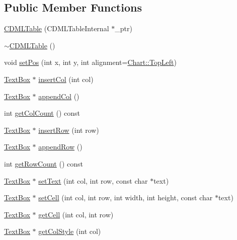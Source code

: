 \subsection*{Public Member Functions}
\begin{DoxyCompactItemize}
\item 
\hyperlink{class_c_d_m_l_table_a88e819b536ce3deca496ff54224bc939}{C\+D\+M\+L\+Table} (C\+D\+M\+L\+Table\+Internal $\ast$\+\_\+ptr)
\item 
\hyperlink{class_c_d_m_l_table_a1d115374895e7594e70e25b45816c29d}{$\sim$\+C\+D\+M\+L\+Table} ()
\item 
void \hyperlink{class_c_d_m_l_table_ae3601809a2a92183ceb02a33644cfd89}{set\+Pos} (int x, int y, int alignment=\hyperlink{namespace_chart_ae222e51ce11a254450b6ddfbc862680aa0bf92d1d2d6713aa62e92b86b9a8532f}{Chart\+::\+Top\+Left})
\item 
\hyperlink{class_text_box}{Text\+Box} $\ast$ \hyperlink{class_c_d_m_l_table_afe0bd5a4fac2fbdb0e496c0012d4a851}{insert\+Col} (int col)
\item 
\hyperlink{class_text_box}{Text\+Box} $\ast$ \hyperlink{class_c_d_m_l_table_ab81a2b5f80d3feac37249426a12fdabf}{append\+Col} ()
\item 
int \hyperlink{class_c_d_m_l_table_a5e8f4f631d3b13d12f02126232762630}{get\+Col\+Count} () const
\item 
\hyperlink{class_text_box}{Text\+Box} $\ast$ \hyperlink{class_c_d_m_l_table_aff5435de1e1d2a179c50030267feac49}{insert\+Row} (int row)
\item 
\hyperlink{class_text_box}{Text\+Box} $\ast$ \hyperlink{class_c_d_m_l_table_a1ce86017996573f4c00571e59be500e1}{append\+Row} ()
\item 
int \hyperlink{class_c_d_m_l_table_aef39ffb95d09fd1cf91e9c982e5d835f}{get\+Row\+Count} () const
\item 
\hyperlink{class_text_box}{Text\+Box} $\ast$ \hyperlink{class_c_d_m_l_table_afc130341376816bb3a668f8cb3124cad}{set\+Text} (int col, int row, const char $\ast$text)
\item 
\hyperlink{class_text_box}{Text\+Box} $\ast$ \hyperlink{class_c_d_m_l_table_a0721f5e22efe702444137302cb8a0eeb}{set\+Cell} (int col, int row, int width, int height, const char $\ast$text)
\item 
\hyperlink{class_text_box}{Text\+Box} $\ast$ \hyperlink{class_c_d_m_l_table_ae4d272ac2aeaaadea380aff21500a176}{get\+Cell} (int col, int row)
\item 
\hyperlink{class_text_box}{Text\+Box} $\ast$ \hyperlink{class_c_d_m_l_table_a66421a52cef917dcf33ab52dcde819af}{get\+Col\+Style} (int col)

\end{DoxyCompactItemize}
